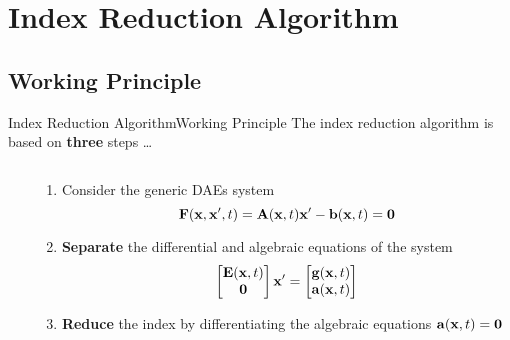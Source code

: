
\section{Index Reduction Algorithm}

\subsection{Working Principle}

\begin{frame}{Index Reduction Algorithm}{Working Principle}
  The index reduction algorithm is based on \textbf{three} steps \dots
  \begin{columns}
    \begin{column}[c]{0.2\textwidth}
      \flushright
      \vspace{-1.3em}%
    \end{column}
    \begin{column}[c]{0.85\textwidth}
      \begin{enumerate}[<+->]
        \item Consider the generic \acsp{DAE} system
        \begin{equation*}
          \mathbf{F}(\mathbf{x}, \mathbf{x}^\prime, t) = \mathbf{A}(\mathbf{x}, t) \mathbf{x}^\prime - \mathbf{b}(\mathbf{x}, t) = \mathbf{0}
        \end{equation*}
        \item \textbf{Separate} the differential and algebraic equations of the system
        \begin{equation*}
          \begin{bmatrix} \mathbf{E}(\mathbf{x}, t) \\ \mathbf{0} \end{bmatrix} \mathbf{x}^\prime = \begin{bmatrix} \mathbf{g}(\mathbf{x}, t) \\ \mathbf{a}(\mathbf{x}, t) \end{bmatrix}
        \end{equation*}
        \item \textbf{Reduce} the index by differentiating the algebraic equations $\mathbf{a}(\mathbf{x}, t) = \mathbf{0}$
      \end{enumerate}
    \end{column}
  \end{columns}
  \vspace{0.75em}
\end{frame}

